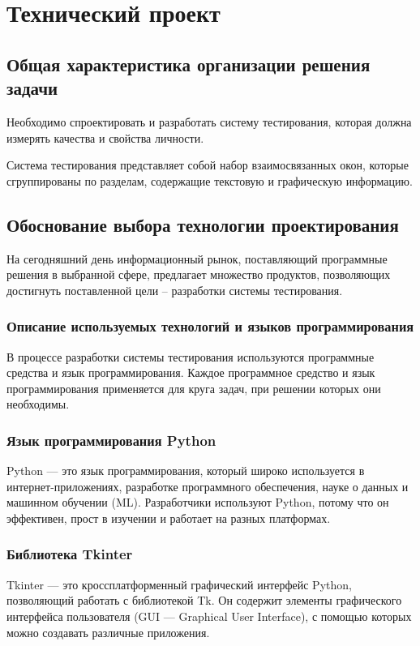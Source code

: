 \section{Технический проект}
\subsection{Общая характеристика организации решения задачи}

Необходимо спроектировать и разработать систему тестирования, которая должна измерять качества и свойства личности.

Система тестирования представляет собой набор взаимосвязанных окон, которые сгруппированы по разделам, содержащие текстовую и графическую информацию. 

\subsection{Обоснование выбора технологии проектирования}

На сегодняшний день информационный рынок, поставляющий программные решения в выбранной сфере, предлагает множество продуктов, позволяющих достигнуть поставленной цели – разработки системы тестирования.

\subsubsection{Описание используемых технологий и языков программирования}

В процессе разработки системы тестирования используются программные средства и язык программирования. Каждое программное средство и язык программирования применяется для круга задач, при решении которых они необходимы.

\subsubsection{Язык программирования Python}

Python — это язык программирования, который широко используется в интернет-приложениях, разработке программного обеспечения, науке о данных и машинном обучении (ML). Разработчики используют Python, потому что он эффективен, прост в изучении и работает на разных платформах.

\subsubsection{Библиотека Tkinter}
Tkinter — это кроссплатформенный графический интерфейс Python, позволяющий работать с библиотекой Tk. Он содержит элементы графического интерфейса пользователя (GUI — Graphical User Interface), с помощью которых можно создавать различные приложения.

